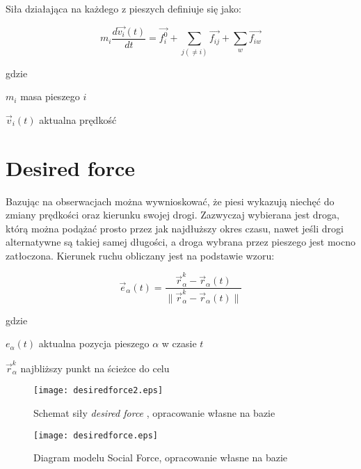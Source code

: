 Siła działająca na każdego z pieszych definiuje się jako:

\begin{equation}
m_{i} \frac{d\vec{v_{i}}(t)}{dt} = \vec{f_{i}^{0}} + \sum_{j(\neq i)} \vec{f_{ij}} + \sum _{w} \vec{f_{iw}}
\end{equation}

gdzie
\begin{eqwhere}[2cm]
	\item[$m_{i}$] masa pieszego $i$
	\item[$\vec{v}_{i}(t)$] aktualna prędkość
\end{eqwhere}

\section{Desired force}
\label{sec:desiredForce}

Bazując na obserwacjach można wywnioskować, że piesi wykazują niechęć do zmiany prędkości oraz kierunku swojej drogi. Zazwyczaj wybierana jest droga, którą można podążać prosto przez jak najdłuższy okres czasu, nawet jeśli drogi alternatywne są takiej samej długości, a droga wybrana przez pieszego jest mocno zatłoczona. Kierunek ruchu obliczany jest na podstawie wzoru:

\begin{equation}
\vec{e}_{\alpha}(t) = \frac{\vec{r}_{\alpha}^{k} - \vec{r}_{\alpha}(t)}{\parallel \vec{r}_{\alpha}^{k} - \vec{r}_{\alpha}(t) \parallel}
\end{equation}

gdzie
\begin{eqwhere}[2cm]
	\item[$e_{\alpha}(t)$] aktualna pozycja pieszego $\alpha$ w czasie $t$
	\item[$\vec{r}_{\alpha}^{k}$] najbliższy punkt na ścieżce do celu
\end{eqwhere}

\begin{figure}
\centering
\texttt{[image: desiredforce2.eps]}
\caption{Schemat siły \textit{desired force} , opracowanie własne na bazie \cite{AMSFMfPBSaSC}}
\end{figure}

\begin{figure}
\centering
\texttt{[image: desiredforce.eps]}
\caption{Diagram modelu Social Force, opracowanie własne na bazie \cite{GuideCrowdDynViaModifiedSocialForceModel}}
\end{figure}

